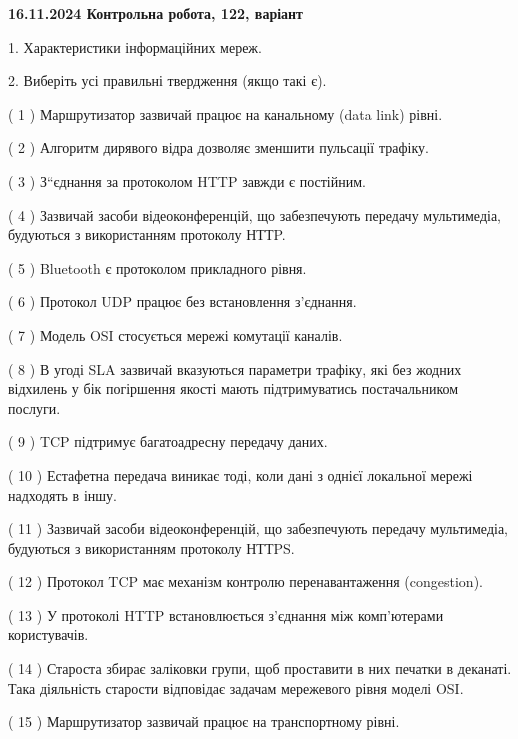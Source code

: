 \documentclass[12pt, ukrainian]{article}
\begin{document}
\vspace{4mm}
\newpage
\begin {large}

\textbf{16.11.2024 Контрольна робота, 122, варіант  }\par


{
1. Характеристики інформаційних мереж.



\vspace{5mm}
2. Виберіть усі правильні твердження (якщо такі є).\par
\vspace{2mm}

( 1 ) Маршрутизатор зазвичай працює на канальному (data link) рівні.

( 2 ) Алгоритм дирявого відра дозволяє зменшити пульсації трафіку.

( 3 ) З“єднання за протоколом  HTTP завжди є постійним.

( 4 ) Зазвичай засоби відеоконференцій, що забезпечують передачу мультимедіа, будуються з використанням протоколу НТТP.

( 5 ) Bluetooth є протоколом прикладного рівня.

( 6 ) Протокол UDP працює без встановлення з'єднання.

( 7 ) Модель OSI стосується мережі комутації каналів.

( 8 ) В угоді SLA зазвичай вказуються параметри трафіку, які без жодних відхилень у бік погіршення якості мають підтримуватись постачальником послуги.

( 9 ) TCP підтримує багатоадресну передачу даних.

( 10 ) Естафетна передача виникає тоді, коли дані з однієї локальної мережі надходять в іншу.

( 11 ) Зазвичай засоби відеоконференцій, що забезпечують передачу мультимедіа, будуються з використанням протоколу НТТPS.

( 12 ) Протокол TCP має механізм контролю перенавантаження (congestion).

( 13 ) У протоколі HTTP встановлюється з'єднання між комп'ютерами користувачів.

( 14 ) Староста збирає заліковки групи, щоб проставити в них печатки в деканаті. Така діяльність старости відповідає задачам мережевого рівня моделі OSI.

( 15 ) Маршрутизатор зазвичай працює на транспортному рівні.
}
\end {large}
\end{document}
